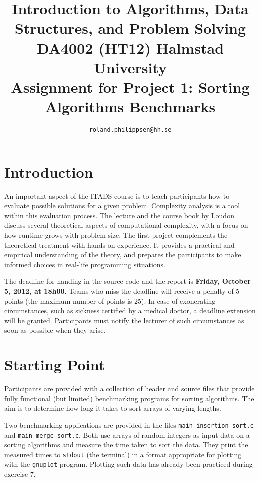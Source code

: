 \documentclass[a4paper,10pt]{article}
\begin{document}
\title{
  {\normalsize
    Introduction to Algorithms, Data Structures, and Problem Solving\\
    DA4002 (HT12) Halmstad University}\\
  Assignment for Project 1: Sorting Algorithms Benchmarks\\
}
\author{
  \texttt{roland.philippsen@hh.se}
}
\maketitle



\section{Introduction}

An important aspect of the ITADS course is to teach participants how to evaluate possible solutions for a given problem.
Complexity analysis is a tool within this evaluation process.
The lecture and the course book by Loudon~\cite{loudon} discuss several theoretical aspects of computational complexity, with a focus on how runtime grows with problem size.
The first project complements the theoretical treatment with hands-on experience.
It provides a practical and empirical understanding of the theory, and prepares the participants to make informed choices in real-life programming situations.

The deadline for handing in the source code and the report is \textbf{Friday, October 5, 2012, at 18h00}.
Teams who miss the deadline will receive a penalty of 5 points (the maximum number of points is 25).
In case of exonerating circumstances, such as sickness certified by a medical doctor, a deadline extension will be granted.
Participants must notify the lecturer of such circumstances as soon as possible when they arise.



\section{Starting Point}

Participants are provided with a collection of header and source files that provide fully functional (but limited) benchmarking programs for sorting algorithms.
The aim is to determine how long it takes to sort arrays of varying lengths.

Two benchmarking applications are provided in the files \texttt{main-insertion-sort.c} and \texttt{main\--merge\--sort.c}.
Both use arrays of random integers as input data on a sorting algorithms and measure the time taken to sort the data.
They print the measured times to \texttt{stdout} (the terminal) in a format appropriate for plotting with the \texttt{gnuplot} program.
Plotting such data has already been practiced during exercise 7.
\end{document}
